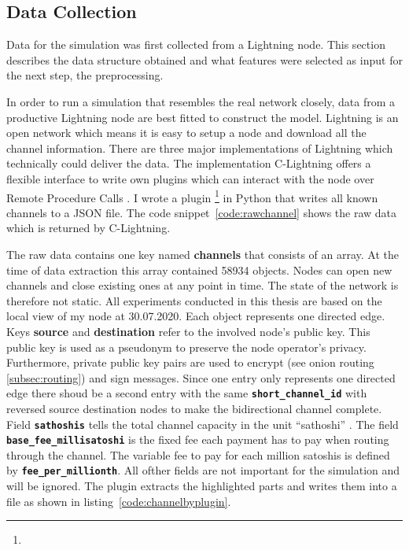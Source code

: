 \documentclass[final]{fhnwreport}       %
\begin{document}
\subsection{Data Collection}\label{subsec:datacol}
Data for the simulation was first collected from a Lightning node. This section describes the data structure obtained and what features were selected as input for the next step, the preprocessing. 

In order to run a simulation that resembles the real network closely, data from a productive Lightning node are best fitted to construct the model. Lightning is an open network which means it is easy to setup a node and download all the channel information. There are three major implementations of Lightning which technically could deliver the data. The implementation C-Lightning offers a flexible interface to write own plugins which can interact with the node over Remote Procedure Calls . I wrote a plugin \footnote{\gitpluginurl} in Python that writes all known channels to a JSON file. The code snippet~\ref{code:rawchannel} shows the raw data which is returned by C-Lightning. 


The raw data contains one key named \textbf{channels} that consists of an array. At the time of data extraction this array contained 58934 objects. Nodes can open new channels and close existing ones at any point in time. The state of the network is therefore not static. All experiments conducted in this thesis are based on the local view of my node at 30.07.2020. Each object represents one directed edge. Keys \textbf{source} and \textbf{destination} refer to the involved node's public key. This public key is used as a pseudonym to preserve the node operator's privacy. Furthermore, private public key pairs are used to encrypt (see onion routing \ref{subsec:routing}) and sign messages. Since one entry only represents one directed edge there shoud be a second entry with the same \textbf{\texttt{short\_channel\_id}} with reversed source destination nodes to make the bidirectional channel complete. Field \textbf{\texttt{sathoshis}} tells the total channel capacity in the unit ``sathoshi'' . The field \textbf{\texttt{base\_fee\_millisatoshi}} is the fixed fee each payment has to pay when routing through the channel. The variable fee to pay for each million satoshis is defined by \textbf{\texttt{fee\_per\_millionth}}. All ofther fields are not important for the simulation and will be ignored. The plugin extracts the highlighted parts and writes them into a file as shown in listing~\ref{code:channelbyplugin}. 
\end{document}
